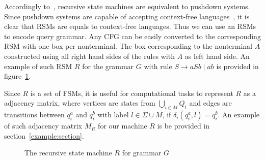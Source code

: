 Accordingly to~\cite{rsm:analysis:10.1007/3-540-44585-4_18}, recursive state machines are equivalent to pushdown systems. Since pushdown systems are capable of accepting context-free languages~\cite{automata:theory:10.5555/1177300}, it is clear that RSMs are equals to context-free languages.
Thus we can use an RSMs to encode query grammar. 
Any CFG can be easily converted to the corresponding RSM with one box per nonterminal. The box corresponding to the nonterminal $A$ constructed using all right hand sides of the rules with $A$ as left hand side. 
An example of such RSM $R$ for the grammar $G$ with rule $S \to a S b \mid a b$ is provided in figure~\ref{example:automata}.


Since $R$ is a set of FSMs, it is useful for computational tasks to represent $R$ as a adjacency matrix, where vertices are states from $\bigcup_{i \in M}Q_i$ and edges are transitions between $q_i^a$ and $q_i^b$ with label $l \in \Sigma \cup M$, if $\delta_i (q_i^a, l) = q_i^b$. An example of such adjacency matrix $M_R$ for our machine $R$ is be provided in section~\ref{example:section}.


\begin{figure}[h]
    \centering
    \caption{The recursive state machine $R$ for grammar $G$}
    \label{example:automata}
\end{figure}

